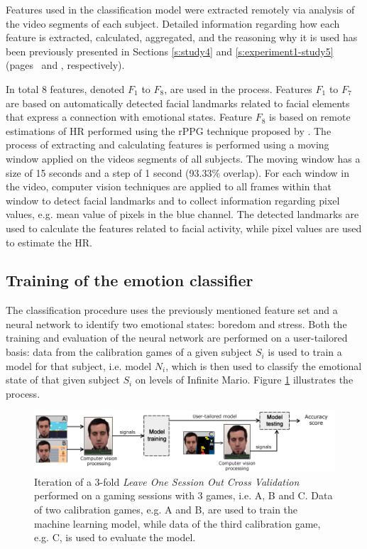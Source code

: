 Features used in the classification model were extracted remotely via analysis of the video segments of each subject. Detailed information regarding how each feature is extracted, calculated, aggregated, and the reasoning why it is used has been previously presented in Sections \ref{s:study4} and \ref{s:experiment1-study5} (pages \pageref{s:study4}\ and \pageref{s:experiment1-study5}, respectively).

In total 8 features, denoted $F_1$ to $F_8$, are used in the process. Features $F_1$ to $F_7$ are based on automatically detected facial landmarks related to facial elements that express a connection with emotional states. Feature $F_8$ is based on remote estimations of HR performed using the rPPG technique proposed by \textcite{poh2011advancements}. The process of extracting and calculating features is performed using a moving window applied on the videos segments of all subjects. The moving window has a size of 15 seconds and a step of 1 second (93.33\% overlap). For each window in the video, computer vision techniques are applied to all frames within that window to detect facial landmarks and to collect information regarding pixel values, e.g. mean value of pixels in the blue channel. The detected landmarks are used to calculate the features related to facial activity, while pixel values are used to estimate the HR.

\subsection{Training of the emotion classifier}

The classification procedure uses the previously mentioned feature set and a neural network to identify two emotional states: boredom and stress. Both the training and evaluation of the neural network are performed on a user-tailored basis: data from the calibration games of a given subject $S_i$ is used to train a model for that subject, i.e. model $N_i$, which is then used to classify the emotional state of that given subject $S_i$ on levels of Infinite Mario. Figure \ref{fig:experiment2-training-evaluation} illustrates the process. 

\begin{figure}[ht]
    \centering
    \includegraphics[width=\textwidth]{figures/machine-learning-investigation.png}
    \caption{Iteration of a 3-fold \textit{Leave One Session Out Cross Validation} performed on a gaming sessions with 3 games, i.e. A, B and C. Data of two calibration games, e.g. A and B, are used to train the machine learning model, while data of the third calibration game, e.g. C, is used to evaluate the model.}
    \label{fig:experiment2-training-evaluation}
\end{figure}

